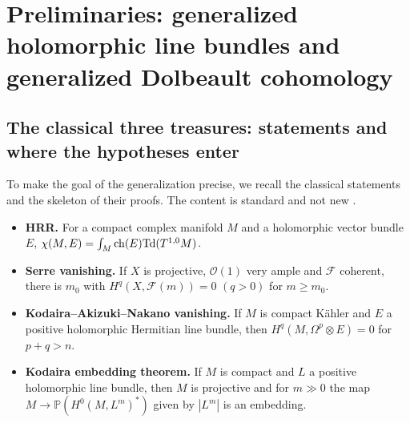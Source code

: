 \section{Preliminaries: generalized holomorphic line bundles and generalized Dolbeault cohomology}\label{sec:prelim}
\subsection{The classical three treasures: statements and where the hypotheses enter}\label{subsec:classical}
To make the goal of the generalization precise, we recall the classical statements and the skeleton of their proofs. The content is standard and not new \tC.

\begin{itemize}
\item \textbf{HRR.} For a compact complex manifold $M$ and a holomorphic vector bundle $E$, $\chi(M,E)=\int_M\mathrm{ch}(E)\mathrm{Td}(T^{1,0}M)$. 
\item \textbf{Serre vanishing.} If $X$ is projective, $\mathcal O(1)$ very ample and $\mathcal F$ coherent, there is $m_0$ with $H^q(X,\mathcal F(m))=0$ $(q>0)$ for $m\ge m_0$. 
\item \textbf{Kodaira--Akizuki--Nakano vanishing.} If $M$ is compact K\"ahler and $E$ a positive holomorphic Hermitian line bundle, then $H^q(M,\Omega^p\otimes E)=0$ for $p+q>n$. 
\item \textbf{Kodaira embedding theorem.} If $M$ is compact and $L$ a positive holomorphic line bundle, then $M$ is projective and for $m\gg0$ the map $M\to\mathbb P(H^0(M,L^m)^*)$ given by $|L^m|$ is an embedding. 
\end{itemize}

